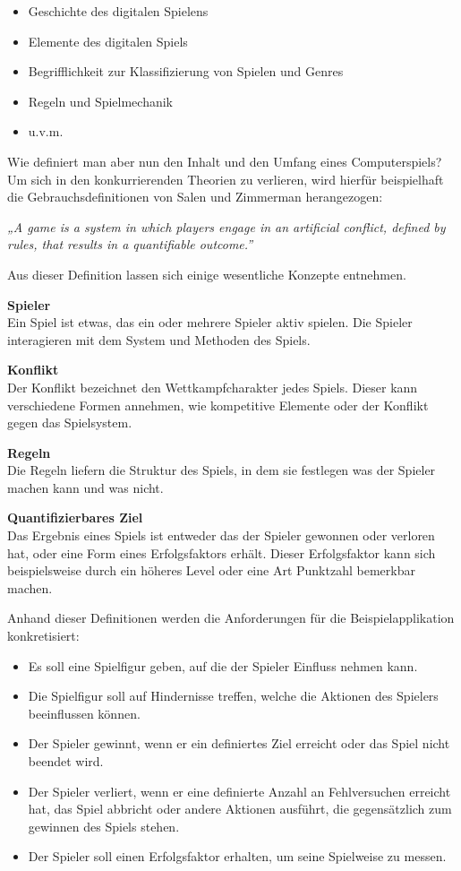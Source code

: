 \begin{itemize}
	\item Geschichte des digitalen Spielens
	\item Elemente des digitalen Spiels
	\item Begrifflichkeit zur Klassifizierung von Spielen und Genres
	\item Regeln und Spielmechanik
	\item u.v.m.
\end{itemize}


Wie definiert man aber nun den Inhalt und den Umfang eines Computerspiels?
Um sich in den konkurrierenden Theorien zu verlieren, wird hierfür beispielhaft die Gebrauchsdefinitionen von Salen und Zimmerman herangezogen:

\bigskip
\emph{„A game is a system in which players engage in an artificial conflict, defined by rules, that results in a quantifiable outcome.”} \citep[80]{salen_zimmerman}
\bigskip

Aus dieser Definition lassen sich einige wesentliche Konzepte entnehmen.

\bigskip
\textbf{Spieler}\\
Ein Spiel ist etwas, das ein oder mehrere Spieler aktiv spielen. Die Spieler interagieren mit dem System und Methoden des Spiels.

\bigskip
\textbf{Konflikt}\\
Der Konflikt bezeichnet den Wettkampfcharakter jedes Spiels. Dieser kann verschiedene Formen annehmen, wie kompetitive Elemente oder der Konflikt gegen das Spielsystem. 

\bigskip
\textbf{Regeln}\\
Die Regeln liefern die Struktur des Spiels, in dem sie festlegen was der Spieler machen kann und was nicht.

\bigskip
\textbf{Quantifizierbares Ziel}\\
Das Ergebnis eines Spiels ist entweder das der Spieler gewonnen oder verloren hat, oder eine Form eines Erfolgsfaktors erhält. Dieser Erfolgsfaktor kann sich beispielsweise durch ein höheres Level oder eine Art Punktzahl bemerkbar machen. 
\citep[80]{salen_zimmerman}

\bigskip
Anhand dieser Definitionen werden die Anforderungen für die Beispielapplikation konkretisiert:

\begin{itemize}
	\item Es soll eine Spielfigur geben, auf die der Spieler Einfluss nehmen kann.
	\item Die Spielfigur soll auf Hindernisse treffen, welche die Aktionen des Spielers beeinflussen können.
	\item Der Spieler gewinnt, wenn er ein definiertes Ziel erreicht oder das Spiel nicht beendet wird.
	\item Der Spieler verliert, wenn er eine definierte Anzahl an Fehlversuchen erreicht hat, das Spiel abbricht oder andere Aktionen ausführt, die gegensätzlich zum gewinnen des Spiels stehen.
	\item Der Spieler soll einen Erfolgsfaktor erhalten, um seine Spielweise zu messen.
\end{itemize}


